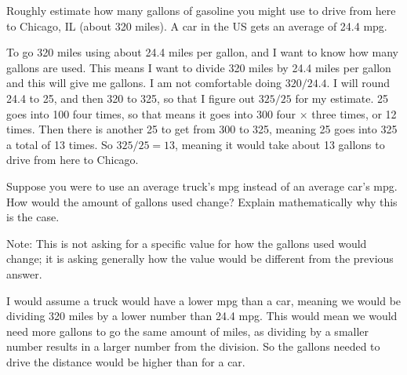 \documentclass[12pt]{ximera}
\begin{document}
\begin{problem}
Roughly estimate how many gallons of gasoline you might use to drive from here to
Chicago, IL (about 320 miles). A car in the US gets an average of 24.4 mpg.

\begin{freeResponse}
\end{freeResponse}

\begin{solution}
To go 320 miles using about 24.4 miles per gallon, and I want to know how many gallons
are used. This means I want to divide 320 miles by 24.4 miles per gallon and this will
give me gallons. I am not comfortable doing $320/24.4$. I will round 24.4 to 25, and
then 320 to 325, so that I figure out $325/25$ for my estimate. 25 goes into 100 four
times, so that means it goes into 300 four $\times$ three times, or 12 times. Then there
is another 25 to get from 300 to 325, meaning 25 goes into 325 a total of 13 times. So
$325/25 = 13$, meaning it would take about 13 gallons to drive from here to Chicago.
\end{solution}
\end{problem}

\begin{problem}
Suppose you were to use an average truck's mpg instead of an average car's mpg. How
would the amount of gallons used change? Explain mathematically why this is the case.

Note: This is not asking for a specific value for how the gallons used would change; it
is asking generally how the value would be different from the previous answer.

\begin{freeResponse}
\end{freeResponse}

\begin{solution}
I would assume a truck would have a lower mpg than a car, meaning we would be dividing
320 miles by a lower number than 24.4 mpg. This would mean we would need more gallons to
go the same amount of miles, as dividing by a smaller number results in a larger number
from the division. So the gallons needed to drive the distance would be higher than for
a car.
\end{solution}
\end{problem}
\end{document}
